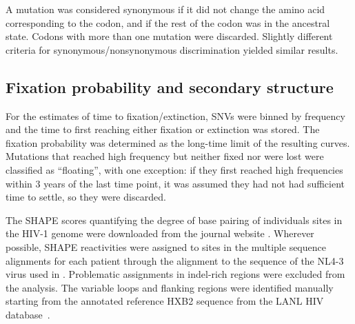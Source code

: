 \documentclass[11pt]{article}
\begin{document}
A mutation was considered synonymous if it did not change the amino acid
corresponding to the codon, and if the rest of the codon was in the ancestral
state. Codons with more than one mutation were discarded. Slightly different
criteria for synonymous/nonsynonymous discrimination yielded similar results.

\subsection*{Fixation probability and secondary structure}
For the estimates of time to fixation/extinction, SNVs were binned by
frequency and the time to first reaching either fixation or extinction was
stored. The fixation probability was determined as the long-time limit of the
resulting curves. Mutations that reached high frequency but neither fixed nor
were lost were classified as ``floating'', with one exception: if they first
reached high frequencies within 3 years of the last time point, it was assumed
they had not had sufficient time to settle, so they were discarded.

The SHAPE scores quantifying the degree of base pairing of individuals sites in
the HIV-1 genome were downloaded from the journal website
\citep{watts_architecture_2009}. Wherever possible, SHAPE reactivities were
assigned to sites in the multiple sequence alignments for each patient through
the alignment to the sequence of the NL4-3 virus used in
\citep{watts_architecture_2009}. Problematic assignments in indel-rich
regions were excluded from the analysis. The variable loops and flanking
regions were identified manually starting from the annotated reference HXB2
sequence from the LANL HIV database~\citep{LANL2012}. 

\end{document}
